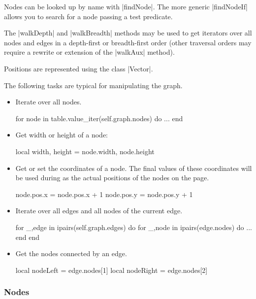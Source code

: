 Nodes can be looked up by name with |findNode|. The more generic
|findNodeIf| allows you to search for a node passing a test
predicate. 

The |walkDepth| and |walkBreadth| methods may be used to get
iterators over all nodes and edges in a depth-first or breadth-first
order (other traversal orders may require a rewrite or extension of the
|walkAux| method).

Positions are represented using the class |Vector|.

The following tasks are typical for manipulating the graph.

\begin{itemize}
\item Iterate over all nodes.
\begin{codeexample}
for node in table.value_iter(self.graph.nodes) do
   ...
end
\end{codeexample}
\item Get width or height of a node:
\begin{codeexample}
local width, height = node.width, node.height
\end{codeexample}
\item Get or set the coordinates of a node. The final values of these
  coordinates will be used during as the actual positions of the nodes
  on the page.
\begin{codeexample}
node.pos.x = node.pos.x + 1
node.pos.y = node.pos.y + 1
\end{codeexample}
\item Iterate over all edges and all nodes of the current edge.
\begin{codeexample}
for _,edge in ipairs(self.graph.edges) do
   for _,node in ipairs(edge.nodes) do
      ...
   end
end
\end{codeexample}
\item Get the nodes connected by an edge.
\begin{codeexample}
local nodeLeft = edge.nodes[1]
local nodeRight = edge.nodes[2]
\end{codeexample}
\end{itemize}

%
%
%
%



\subsubsection{Nodes}

